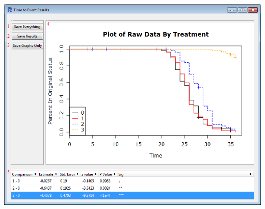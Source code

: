 \documentclass[a4paper]{article}
\begin{document}
\begin{center}
\includegraphics[width=\textwidth,keepaspectratio]{Time2Event3.png}
\end{center} 
\end{document}
